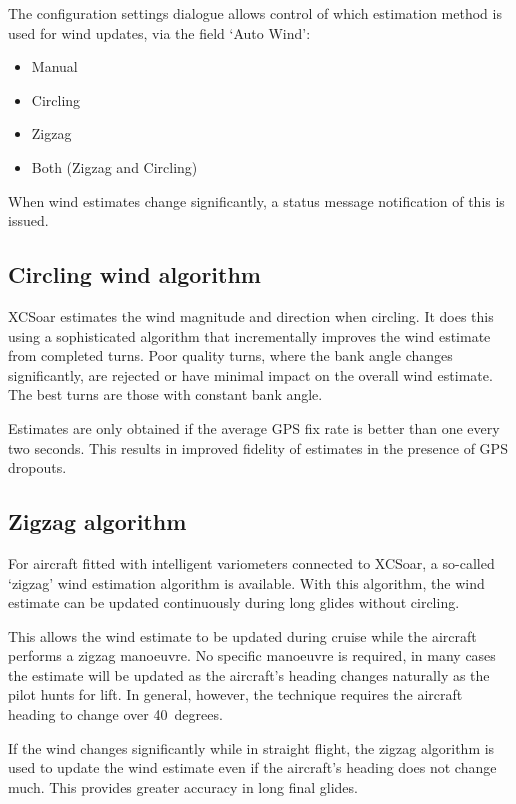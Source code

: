The configuration  settings dialogue allows control of which
estimation method is used for wind updates, via the field `Auto Wind':
\begin{itemize}
\item Manual
\item Circling
\item Zigzag
\item Both (Zigzag and Circling)
\end{itemize}

When wind estimates change significantly, a status message
notification of this is issued.

\subsection*{Circling wind algorithm}

XCSoar estimates the wind magnitude and direction when circling.  It
does this using a sophisticated algorithm that incrementally improves
the wind estimate from completed turns.  Poor quality turns, where
the bank angle changes significantly, are rejected or have minimal
impact on the overall wind estimate.  The best turns are those with
constant bank angle.

Estimates are only obtained if the average GPS fix rate is better than
one every two seconds.  This results in improved fidelity of estimates
in the presence of GPS dropouts.


\subsection*{Zigzag algorithm}

For aircraft fitted with intelligent variometers connected to XCSoar,
a so-called `zigzag' wind estimation algorithm is available.  With
this algorithm, the wind estimate can be updated continuously during
long glides without circling.

This allows the wind estimate to be updated during cruise while the
aircraft performs a zigzag manoeuvre.  No specific manoeuvre is
required, in many cases the estimate will be updated as the aircraft's
heading changes naturally as the pilot hunts for lift.  In general,
however, the technique requires the aircraft heading to change over 40~degrees.

If the wind changes significantly while in straight flight, the
zigzag algorithm is used to update the wind estimate even if the
aircraft's heading does not change much. This provides greater
accuracy in long final glides.


